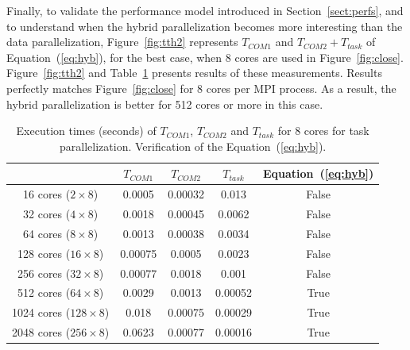 Finally, to validate the performance model introduced in Section~\ref{sect:perfs}, and to understand when the hybrid parallelization becomes more interesting than the data parallelization, Figure~\ref{fig:tth2} represents $T_{COM1}$ and $T_{COM2}+T_{task}$ of Equation~(\ref{eq:hyb}), for the best case, \ie when 8 cores are used in Figure~\ref{fig:close}.  Figure~\ref{fig:tth2} and Table~\ref{fig:tth} presents results of these measurements. Results perfectly matches Figure~\ref{fig:close} for 8 cores per MPI process. As a result, the hybrid parallelization is better for 512 cores or more in this case.

\begin{table}[!h]
 \begin{center}
 \begin{tabular}{|c|c|c|c|c|}
    \hline 
    & $T_{COM1}$ & $T_{COM2}$ & $T_{task}$ & Equation~(\ref{eq:hyb})\\
   \hline
   16 cores ($2 \times 8$) & 0.0005 & 0.00032 & 0.013 & False\\
   32 cores ($4 \times 8$) & 0.0018 & 0.00045 & 0.0062 & False\\
   64 cores ($8 \times 8$) & 0.0013 & 0.00038 & 0.0034 & False\\
   128 cores ($16 \times 8$) & 0.00075 & 0.0005 & 0.0023 & False\\
   256 cores ($32 \times 8$) & 0.00077 & 0.0018 & 0.001 & False\\
   512 cores ($64 \times 8$) & 0.0029 & 0.0013 & 0.00052 & True\\
   1024 cores ($128 \times 8$) & 0.018 & 0.00075 & 0.00029 & True\\
   2048 cores ($256 \times 8$) & 0.0623 & 0.00077 & 0.00016 & True\\
   \hline
 \end{tabular}
\caption{Execution times (seconds) of $T_{COM1}$, $T_{COM2}$ and $T_{task}$ for 8 cores for task parallelization. Verification of the Equation~(\ref{eq:hyb}).}
\label{fig:tth}
 \end{center}
\end{table}

